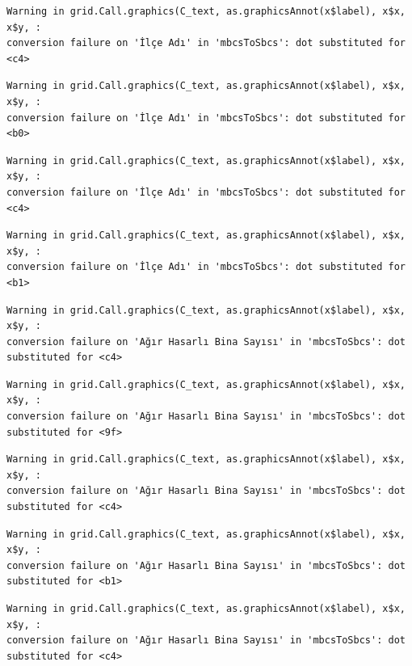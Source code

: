 \documentclass[
  11pt,
  a4paper,
  DIV=11,
  numbers=noendperiod]{scrartcl}
\begin{document}
\begin{verbatim}
Warning in grid.Call.graphics(C_text, as.graphicsAnnot(x$label), x$x, x$y, :
conversion failure on 'İlçe Adı' in 'mbcsToSbcs': dot substituted for <c4>
\end{verbatim}

\begin{verbatim}
Warning in grid.Call.graphics(C_text, as.graphicsAnnot(x$label), x$x, x$y, :
conversion failure on 'İlçe Adı' in 'mbcsToSbcs': dot substituted for <b0>
\end{verbatim}

\begin{verbatim}
Warning in grid.Call.graphics(C_text, as.graphicsAnnot(x$label), x$x, x$y, :
conversion failure on 'İlçe Adı' in 'mbcsToSbcs': dot substituted for <c4>
\end{verbatim}

\begin{verbatim}
Warning in grid.Call.graphics(C_text, as.graphicsAnnot(x$label), x$x, x$y, :
conversion failure on 'İlçe Adı' in 'mbcsToSbcs': dot substituted for <b1>
\end{verbatim}

\begin{verbatim}
Warning in grid.Call.graphics(C_text, as.graphicsAnnot(x$label), x$x, x$y, :
conversion failure on 'Ağır Hasarlı Bina Sayısı' in 'mbcsToSbcs': dot
substituted for <c4>
\end{verbatim}

\begin{verbatim}
Warning in grid.Call.graphics(C_text, as.graphicsAnnot(x$label), x$x, x$y, :
conversion failure on 'Ağır Hasarlı Bina Sayısı' in 'mbcsToSbcs': dot
substituted for <9f>
\end{verbatim}

\begin{verbatim}
Warning in grid.Call.graphics(C_text, as.graphicsAnnot(x$label), x$x, x$y, :
conversion failure on 'Ağır Hasarlı Bina Sayısı' in 'mbcsToSbcs': dot
substituted for <c4>
\end{verbatim}

\begin{verbatim}
Warning in grid.Call.graphics(C_text, as.graphicsAnnot(x$label), x$x, x$y, :
conversion failure on 'Ağır Hasarlı Bina Sayısı' in 'mbcsToSbcs': dot
substituted for <b1>
\end{verbatim}

\begin{verbatim}
Warning in grid.Call.graphics(C_text, as.graphicsAnnot(x$label), x$x, x$y, :
conversion failure on 'Ağır Hasarlı Bina Sayısı' in 'mbcsToSbcs': dot
substituted for <c4>
\end{verbatim}
\end{document}
